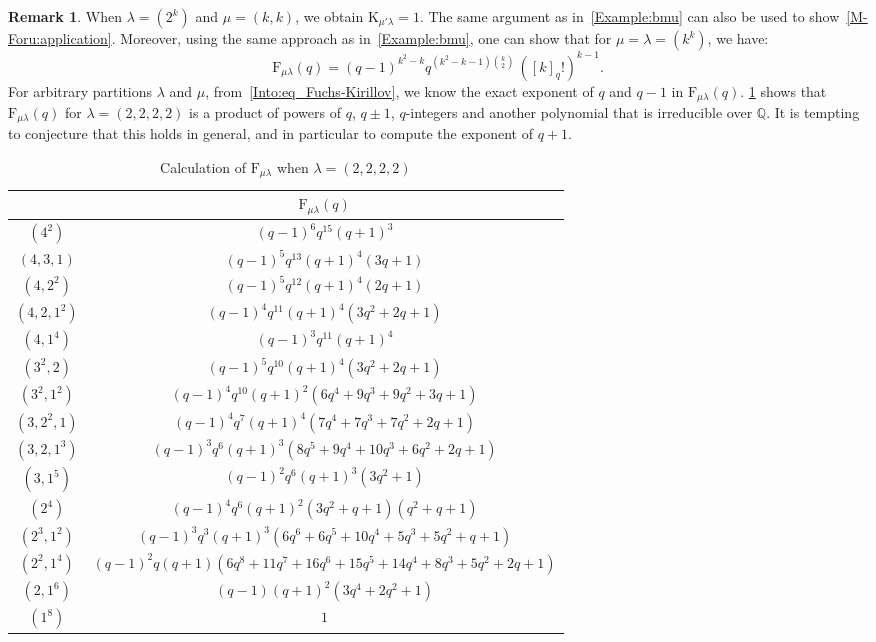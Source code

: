 \documentclass[12pt,a4paper,reqno]{amsart}
\theoremstyle{plain}
\theoremstyle{definition}
\newtheorem{remark}[theorem]{Remark}
\newcommand{\1}{\mathds{1}}
\newcommand{\F}{\mathrm{F}}
\newcommand{\K}{{\mathrm{K}}}
\begin{document}
\begin{remark} When $\lambda = (2^k)$ and $\mu = (k,k)$, we obtain $\K_{\mu'\lambda} = 1$. The same argument as in~\cref{Example:bmu} can also be used to show~\eqref{M-Foru:application}. Moreover, using the same approach as in~\cref{Example:bmu}, one can show that for $\mu = \lambda = (k^k)$, we have:
$$
\F_{\mu\lambda}(q)=(q-1)^{k^2-k}q^{(k^2-k-1)\binom{k}{2}}\, \left([k]_q!\right)^{k-1}.
$$
For arbitrary partitions $\lambda$ and $\mu$, from~\cref{Into:eq_Fuchs-Kirillov}, we know the exact exponent of $q$ and $q-1$ in $\F_{\mu\lambda}(q)$. \cref{Table2} shows that $\F_{\mu\lambda}(q)$ for $\lambda=(2,2,2,2)$ is a product of powers of $q$, $q\pm 1$, $q$-integers and another polynomial that is irreducible over $\mathbb Q$. It is tempting to conjecture that this holds in general, and in particular to compute the exponent of $q+1$. 

\begin{table}[h!]\scriptsize
\renewcommand{\arraystretch}{1.5} %
\centering
\begin{tabular}{|c|c|}
\hline
\text{$\mu$} & $\F_{\mu\lambda}(q)$ \\
\hline
$ (4^2)$ & $(q - 1)^6 q^{15}(q + 1)^3 $ \\
\hline
$(4, 3, 1)$ & $(q - 1)^5 q^{13}(q + 1)^4(3q + 1) $ \\
\hline
$ (4, 2^2)$ & $(q - 1)^5 q^{12}(q + 1)^4(2q + 1) $ \\
\hline
$ (4, 2, 1^2)$ & $(q - 1)^4 q^{11}(q + 1)^4(3q^2 + 2q + 1) $ \\
\hline
$ (4, 1^4)$ & $(q - 1)^3 q^{11}(q + 1)^4$   \\
\hline
$ (3^2, 2)$ & $(q - 1)^5 q^{10}(q + 1)^4(3q^2 + 2q + 1) $ \\
\hline
$ (3^2, 1^2)$ & $(q - 1)^4 q^{10}(q + 1)^2(6q^4 + 9q^3 + 9q^2 + 3q + 1) $ \\
\hline
$ (3, 2^2, 1)$ & $(q - 1)^4 q^7(q + 1)^4(7q^4 + 7q^3 + 7q^2 + 2q + 1) $ \\
\hline
$ (3, 2, 1^3)$ & $(q - 1)^3 q^6(q + 1)^3 (8q^5 + 9q^4 + 10q^3 + 6q^2 + 2q + 1)$ \\
\hline
$ (3, 1^5)$ & $(q - 1)^2 q^6(q + 1)^3(3q^2 + 1) $ \\
\hline
$ (2^4)$ & $(q - 1)^4 q^6(q + 1)^2 (3q^2 + q + 1)(q^2 + q + 1)$ \\
\hline
$ (2^3, 1^2)$ & $(q - 1)^3 q^3(q + 1)^3(6q^6 + 6q^5 + 10q^4 + 5q^3 + 5q^2 + q + 1) $ \\
\hline
$ (2^2, 1^4)$ & $(q - 1)^2 q(q + 1)(6q^8 + 11q^7 + 16q^6 + 15q^5 + 14q^4 + 8q^3 + 5q^2 + 2q + 1)$ \\
\hline
$ (2, 1^6)$ & $(q - 1)(q + 1)^2(3q^4 + 2q^2 + 1) $ \\
\hline
$ (1^8)$ & $1$ \\
\hline
\end{tabular}
    \caption{\small Calculation of $\F_{\mu\lambda}$ when $\lambda=(2,2,2,2)$}
    \label{Table2}
\end{table}
\end{remark}
\end{document}
